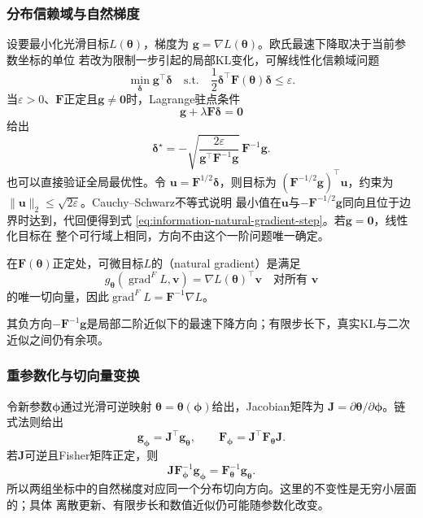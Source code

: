 \subsubsection{分布信赖域与自然梯度}
设要最小化光滑目标\(L(\bm{\theta})\)，梯度为
\(\bm{g}=\nabla L(\bm{\theta})\)。欧氏最速下降取决于当前参数坐标的单位
若改为限制一步引起的局部KL变化，可解线性化信赖域问题
\begin{equation}
  \min_{\bm{\delta}}
  \bm{g}^{\top}\bm{\delta}
  \quad\text{s.t.}\quad
  \frac12\bm{\delta}^{\top}
  \bm{F}(\bm{\theta})\bm{\delta}
  \leq\varepsilon.
  \label{eq:information-natural-gradient-trust-region}
\end{equation}
当\(\varepsilon>0\)、\(\bm{F}\)正定且\(\bm{g}\neq\bm{0}\)时，Lagrange驻点条件
\[
  \bm{g}+\lambda\bm{F}\bm{\delta}=\bm{0}
\]
给出
\begin{equation}
  \bm{\delta}^{\star}
  =
  -
  \sqrt{
    \frac{2\varepsilon}
    {\bm{g}^{\top}\bm{F}^{-1}\bm{g}}
  }\,
  \bm{F}^{-1}\bm{g}.
  \label{eq:information-natural-gradient-step}
\end{equation}
也可以直接验证全局最优性。令
\(\bm{u}=\bm{F}^{1/2}\bm{\delta}\)，则目标为
\((\bm{F}^{-1/2}\bm g)^{\top}\bm u\)，约束为
\(\lVert\bm u\rVert_2\leq\sqrt{2\varepsilon}\)。Cauchy--Schwarz不等式说明
最小值在\(\bm u\)与\(-\bm F^{-1/2}\bm g\)同向且位于边界时达到，代回便得到式
\eqref{eq:information-natural-gradient-step}。若\(\bm g=\bm0\)，线性化目标在
整个可行域上相同，方向不由这个一阶问题唯一确定。
\begin{definition}[自然梯度]
  \label{def:information-natural-gradient}
  在\(\bm F(\bm\theta)\)正定处，可微目标\(L\)的（natural gradient）是满足
  \[ g_{\bm\theta}(\operatorname{grad}^{F}L,\bm v)
      =\nabla L(\bm\theta)^\top\bm v\quad\text{对所有 }\bm v \]
  的唯一切向量，因此\(\operatorname{grad}^{F}L=\bm F^{-1}\nabla L\)。
\end{definition}
其负方向\(-\bm F^{-1}\bm g\)是局部二阶近似下的最速下降方向；有限步长下，真实KL与二次近似之间仍有余项。
\subsubsection{重参数化与切向量变换}
令新参数\(\bm{\phi}\)通过光滑可逆映射
\(\bm{\theta}=\bm{\theta}(\bm{\phi})\)给出，Jacobian矩阵为
\(\bm{J}=\partial\bm{\theta}/\partial\bm{\phi}\)。链式法则给出
\[
  \bm{g}_{\bm{\phi}}=\bm{J}^{\top}\bm{g}_{\bm{\theta}},
  \qquad
  \bm{F}_{\bm{\phi}}
  =
  \bm{J}^{\top}\bm{F}_{\bm{\theta}}\bm{J}.
\]
若\(\bm{J}\)可逆且Fisher矩阵正定，则
\[
  \bm{J}\bm{F}_{\bm{\phi}}^{-1}\bm{g}_{\bm{\phi}}
  =
  \bm{F}_{\bm{\theta}}^{-1}\bm{g}_{\bm{\theta}}.
\]
所以两组坐标中的自然梯度对应同一个分布切向方向。这里的不变性是无穷小层面的；具体
离散更新、有限步长和数值近似仍可能随参数化改变。
